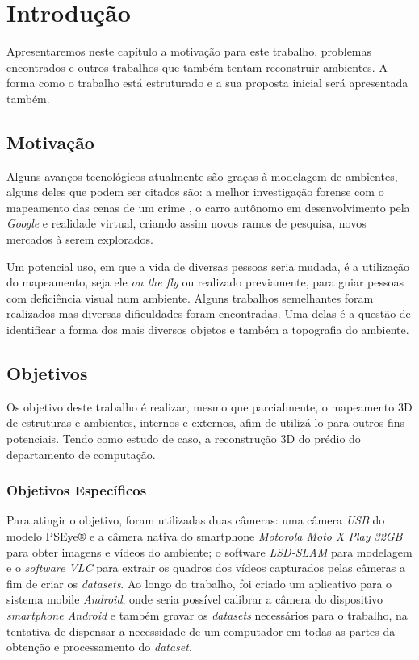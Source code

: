 \chapter{Introdução}

Apresentaremos neste capítulo a motivação para este trabalho, problemas encontrados e outros trabalhos que também tentam reconstruir ambientes. A forma como o trabalho está estruturado e a sua proposta inicial será apresentada também.

\section{Motivação}

Alguns avanços tecnológicos atualmente são graças à modelagem de ambientes, alguns deles que podem ser citados são: a melhor investigação forense com o mapeamento das cenas de um crime \cite{FIT3D}, o carro autônomo em desenvolvimento pela \textit{Google} \cite{googlex} e realidade virtual, criando assim novos ramos de pesquisa, novos mercados à serem explorados.

Um potencial uso, em que a vida de diversas pessoas seria mudada, é a utilização do mapeamento, seja ele \textit{on the fly} ou realizado previamente, para guiar pessoas com deficiência visual num ambiente. Alguns trabalhos semelhantes foram realizados mas diversas dificuldades foram encontradas. Uma delas é a questão de identificar a forma dos mais diversos objetos e também a topografia do ambiente. 


\section{Objetivos}

Os objetivo deste trabalho é realizar, mesmo que parcialmente, o mapeamento 3D de estruturas e ambientes, internos e externos, afim de utilizá-lo para outros fins potenciais. Tendo como estudo de caso, a reconstrução 3D do prédio do departamento de computação.

\subsection{Objetivos Específicos}

Para atingir o objetivo, foram utilizadas duas câmeras: uma câmera \textit{USB} do modelo PSEye® e a câmera nativa do smartphone \textit{Motorola Moto X Play 32GB} para obter imagens e vídeos do ambiente; o software \textit{LSD-SLAM} \cite{LSD-SLAM-Artigo} para modelagem e o \textit{software VLC} para extrair os quadros dos vídeos capturados pelas câmeras a fim de criar os \textit{datasets}. Ao longo do trabalho, foi criado um aplicativo para o sistema mobile \textit{Android}, onde seria possível calibrar a câmera do dispositivo \textit{smartphone Android} e também gravar os \textit{datasets} necessários para o trabalho, na tentativa de dispensar a necessidade de um computador em todas as partes da obtenção e processamento do \textit{dataset}.


